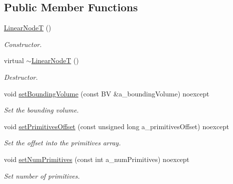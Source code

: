 \subsection*{Public Member Functions}
\begin{DoxyCompactItemize}
\item 
\mbox{\label{classBVH_1_1LinearNodeT_ae7dbdb102840eb271dadea2f25aa6f8b}} 
\hyperlink{classBVH_1_1LinearNodeT_ae7dbdb102840eb271dadea2f25aa6f8b}{Linear\+NodeT} ()
\begin{DoxyCompactList}\small\item\em Constructor. \end{DoxyCompactList}\item 
\mbox{\label{classBVH_1_1LinearNodeT_a4b5dd392397794113ad3b5bb2ed5003a}} 
virtual \hyperlink{classBVH_1_1LinearNodeT_a4b5dd392397794113ad3b5bb2ed5003a}{$\sim$\+Linear\+NodeT} ()
\begin{DoxyCompactList}\small\item\em Destructor. \end{DoxyCompactList}\item 
void \hyperlink{classBVH_1_1LinearNodeT_a03e3dd1c74bf9e66ed692130b49c2e0f}{set\+Bounding\+Volume} (const BV \&a\+\_\+bounding\+Volume) noexcept
\begin{DoxyCompactList}\small\item\em Set the bounding volume. \end{DoxyCompactList}\item 
\mbox{\label{classBVH_1_1LinearNodeT_ace68df1290bd44623c694e6b7ebdec6e}} 
void \hyperlink{classBVH_1_1LinearNodeT_ace68df1290bd44623c694e6b7ebdec6e}{set\+Primitives\+Offset} (const unsigned long a\+\_\+primitives\+Offset) noexcept
\begin{DoxyCompactList}\small\item\em Set the offset into the primitives array. \end{DoxyCompactList}\item 
void \hyperlink{classBVH_1_1LinearNodeT_a1a91e5f540da1b1bb85224db94cd53d8}{set\+Num\+Primitives} (const int a\+\_\+num\+Primitives) noexcept
\begin{DoxyCompactList}\small\item\em Set number of primitives. \end{DoxyCompactList}\item 

\end{DoxyCompactItemize}

